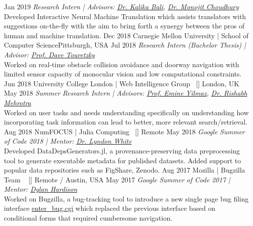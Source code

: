 \begin{experiences}
{    }
\researchexperience
    {}   {}{}{}
    {Jan 2019} {\textit{Research Intern | Advisors:  \href{https://www.microsoft.com/en-us/research/people/kalikab/}{Dr. Kalika Bali}, 
    \href{https://www.microsoft.com/en-us/research/people/monojitc/}{Dr. Monojit Choudhury}
    }\\
    Developed Interactive Neural Machine Translation which assists translators with suggestions on-the-fly with the aim to bring forth a synergy between the pros of human and machine translation.
    }
  \emptySeparator
  \researchexperience
    {Dec 2018}   {Carnegie Mellon University | School of Computer Science}{Pittsburgh, USA}{}
    {Jul 2018} {\textit{Research Intern (Bachelor Thesis) | Advisor:  \href{http://www.cs.cmu.edu/~dst/}{Prof. Dave Touretzky}}\\
    Worked on real-time obstacle collision avoidance and doorway navigation with limited sensor capacity of monocular vision and low computational constraints. 
    }
  \emptySeparator
   \researchexperience
    {Jun 2018}   {University College London | Web Intelligence Group{\normalfont  ~ [\href{http://wi.cs.ucl.ac.uk/index.php/people/}{\small{\websiteSymbol}}]
    }}{London, UK}{}
    {May 2018} {\textit{Summer Research Intern | Advisors: \href{https://sites.google.com/site/emineyilmaz/}{Prof. Emine Yilmaz}, \href{http://rishabhmehrotra.com/}{Dr. Rishabh Mehrotra}}\\
    Worked on user tasks and needs understanding specifically on understanding how incorporating task information can lead to better, more relevant search/retrieval.
    }
  \emptySeparator
    \researchexperience
    {Aug 2018}   {NumFOCUS | Julia Computing{\normalfont  ~ [\href{https://numfocus.org/blog/google-summer-of-code-2018-julia-cohort}{\small{\websiteSymbol}}]
    }}{Remote}{}
    {May 2018} {\textit{Google Summer of Code 2018 | Mentor: \href{https://www.oxinabox.net/}{Dr. Lyndon White}}\\
    Developed DataDepsGenerators.jl, a provenance-preserving data preprocessing tool to generate executable metadata for published datasets. Added support to popular data repositories such as FigShare, Zenodo.
    }
  \emptySeparator
   \researchexperience
    {Aug 2017}   {Mozilla | Bugzilla Team {\normalfont  ~ [\href{https://wiki.mozilla.org/BMO}{\small{\websiteSymbol}}]
    }}{Remote / Austin, USA}{}
    {May 2017} {\textit{Google Summer of Code 2017 | Mentor: \href{https://www.linkedin.com/in/dylanwh/}{Dylan Hardison}}\\
    Worked on Bugzilla, a bug-tracking tool to introduce a new single page bug filing interface \href{https://bugzilla.mozilla.org/enter_bug.cgi}{enter\_bug.cgi} which replaced the previous interface based on conditional forms that required cumbersome navigation.
    }
  
\end{experiences}
\vspace{-4mm}

